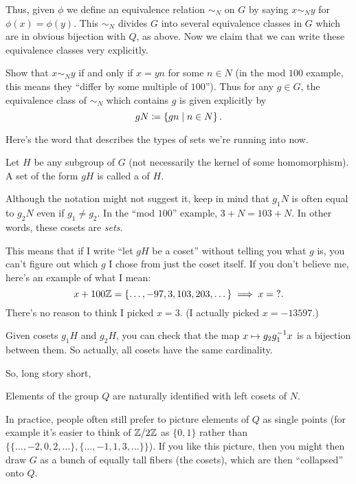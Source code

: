 Thus, given $\phi$ we define an equivalence relation $\sim_N$
on $G$ by saying $x \sim_N y$ for $\phi(x) = \phi(y)$.
This $\sim_N$ divides $G$ into several equivalence classes in $G$
which are in obvious bijection with $Q$, as above.
Now we claim that we can write these equivalence classes very explicitly.

\begin{exercise}
	Show that $x \sim_N y$ if and only if $x = yn$ for some $n \in N$
	(in the mod $100$ example, this means they ``differ by some multiple of $100$'').
	Thus for any $g \in G$, the equivalence class of $\sim_N$ which contains $g$
	is given explicitly by \[ gN \coloneqq \left\{ gn \mid n \in N \right\}. \]
\end{exercise}

Here's the word that describes the types of sets we're running into now.
\begin{definition}
	Let $H$ be any subgroup of $G$ (not necessarily the kernel of some homomorphism).
	A set of the form $gH$ is called a  of $H$.
\end{definition}
\begin{remark}
	Although the notation might not suggest it,
	keep in mind that $g_1N$ is often equal to $g_2N$ even if $g_1 \neq g_2$.
	In the ``mod $100$'' example, $3+N = 103+N$.
	In other words, these cosets are \emph{sets}.

	This means that if I write ``let $gH$ be a coset'' without telling you what $g$ is,
	you can't figure out which $g$ I chose from just the coset itself.
	If you don't believe me, here's an example of what I mean:
	\[ x+100\mathbb Z = \left\{ \dots, -97, 3, 103, 203, \dots \right\} \implies x = {?}. \]
	There's no reason to think I picked $x=3$. (I actually picked $x=-13597$.)
	\label{remark:coset_warning}
\end{remark}
\begin{remark}
	Given cosets $g_1H$ and $g_2H$,
	you can check that the map $x \mapsto g_2g_1^{-1} x$ is a bijection between them.
	So actually, all cosets have the same cardinality.
\end{remark}

So, long story short,
\begin{moral}
	Elements of the group $Q$ are naturally identified with left cosets of $N$.
\end{moral}
In practice, people often still prefer to picture elements of $Q$ as single points
(for example it's easier to think of $\mathbb Z/2\mathbb Z$ as $\{0,1\}$
rather than $\big\{ \{\dots,-2,0,2,\dots\}, \{\dots,-1,1,3,\dots\} \big\}$).
If you like this picture,
then you might then draw $G$ as a bunch of equally tall fibers (the cosets),
which are then ``collapsed'' onto $Q$.

